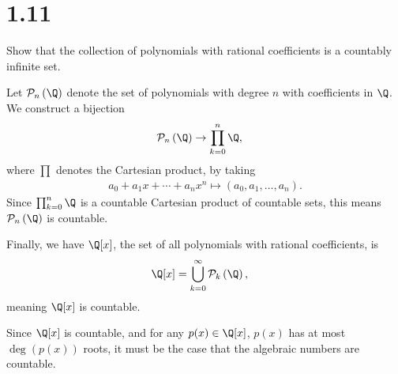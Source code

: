 \documentclass[10pt]{mypackage}
\begin{document}
\section{1.11}%
\begin{problem}
  Show that the collection of polynomials with rational coefficients is a countably infinite set.
\end{problem}
\begin{solution}
  Let $\mathcal{P}_n\left(\Q\right)$ denote the set of polynomials with degree $n$ with coefficients in $\Q$. We construct a bijection
  \begin{align*}
    \mathcal{P}_n\left(\Q\right) &\rightarrow \prod_{k=0}^{n}\Q,
  \end{align*}
  where $\prod$ denotes the Cartesian product, by taking
  \begin{align*}
    a_0 + a_1x + \cdots + a_nx^n \mapsto \left(a_0,a_1,\dots,a_n\right).
  \end{align*}
  Since $\prod_{k=0}^{n}\Q$ is a countable Cartesian product of countable sets, this means $\mathcal{P}_n\left(\Q\right)$ is countable.\newline

  Finally, we have $\Q[x]$, the set of all polynomials with rational coefficients, is
  \begin{align*}
    \Q[x] &= \bigcup_{k=0}^{\infty}\mathcal{P}_k\left(\Q\right),
  \end{align*}
  meaning $\Q[x]$ is countable.\newline

  Since $\Q[x]$ is countable, and for any $p(x)\in \Q[x]$, $p(x)$ has at most $\deg\left(p(x)\right)$ roots, it must be the case that the algebraic numbers are countable.
\end{solution}
\end{document}
